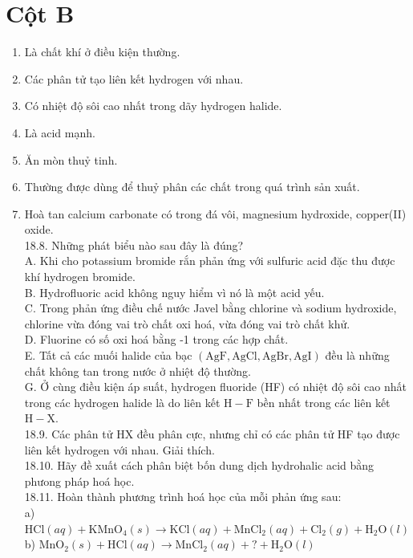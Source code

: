 \documentclass[10pt]{article}
\begin{document}
\section*{Cột B}
\begin{enumerate}
  \item Là chất khí ở điều kiện thường.
  \item Các phân tử tạo liên kết hydrogen với nhau.
  \item Có nhiệt độ sôi cao nhất trong dãy hydrogen halide.
  \item Là acid mạnh.
  \item Ăn mòn thuỷ tinh.
  \item Thường được dùng để thuỷ phân các chất trong quá trình sản xuất.
  \item Hoà tan calcium carbonate có trong đá vôi, magnesium hydroxide, copper(II) oxide.\\
18.8. Những phát biểu nào sau đây là đúng?\\
A. Khi cho potassium bromide rắn phản ứng với sulfuric acid đặc thu được khí hydrogen bromide.\\
B. Hydrofluoric acid không nguy hiểm vì nó là một acid yếu.\\
C. Trong phản ứng điều chế nước Javel bằng chlorine và sodium hydroxide, chlorine vừa đóng vai trò chất oxi hoá, vừa đóng vai trò chất khử.\\
D. Fluorine có số oxi hoá bằng -1 trong các hợp chất.\\
E. Tất cả các muối halide của bạc $(\mathrm{AgF}, \mathrm{AgCl}, \mathrm{AgBr}, \mathrm{AgI})$ đều là những chất không tan trong nước ở nhiệt độ thường.\\
G. Ở cùng điều kiện áp suất, hydrogen fluoride (HF) có nhiệt độ sôi cao nhất trong các hydrogen halide là do liên kết $\mathrm{H}-\mathrm{F}$ bền nhất trong các liên kết $\mathrm{H}-\mathrm{X}$.\\
18.9. Các phân tử HX đều phân cực, nhưng chỉ có các phân tử HF tạo được liên kết hydrogen với nhau. Giải thích.\\
18.10. Hãy đề xuất cách phân biệt bốn dung dịch hydrohalic acid bằng phưong pháp hoá học.\\
18.11. Hoàn thành phương trình hoá học của mỗi phản ứng sau:\\
a) $\mathrm{HCl}(a q)+\mathrm{KMnO}_{4}(s) \rightarrow \mathrm{KCl}(a q)+\mathrm{MnCl}_{2}(a q)+\mathrm{Cl}_{2}(g)+\mathrm{H}_{2} \mathrm{O}(l)$\\
b) $\mathrm{MnO}_{2}(s)+\mathrm{HCl}(a q) \rightarrow \mathrm{MnCl}_{2}(a q)+?+\mathrm{H}_{2} \mathrm{O}(l)$\\

\end{enumerate}
\end{document}

